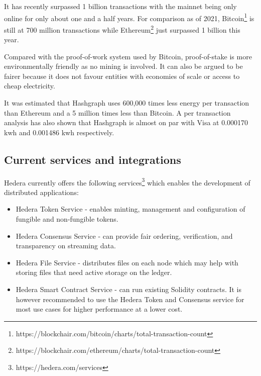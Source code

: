 It has recently surpassed 1 billion transactions with the mainnet being only online for only about one and a half years\cite{kunz2021hedera}. For comparison as of 2021, Bitcoin\footnote{https://blockchair.com/bitcoin/charts/total-transaction-count} is still at 700 million transactions while Ethereum\footnote{https://blockchair.com/ethereum/charts/total-transaction-count} just surpassed 1 billion this year.

Compared with the proof-of-work system used by Bitcoin, proof-of-stake is more environmentally friendly as no mining is involved. It can also be argued to be fairer because it does not favour entities with economies of scale or access to cheap electricity.

It was estimated that Hashgraph uses 600,000 times less energy per transaction than Ethereum and a 5 million times less than Bitcoin\cite{jiro2021power}. A per transaction analysis has also shown that Hashgraph is almost on par with Visa at 0.000170 kwh and 0.001486 kwh respectively.




\subsection{Current services and integrations}

Hedera currently offers the following services\footnote{https://hedera.com/services} which enables the development of distributed applications:

\begin{itemize}
    \item Hedera Token Service - enables minting, management and configuration of fungible and non-fungible tokens.
    \item Hedera Consensus Service - can provide fair ordering, verification, and transparency on streaming data.
    \item Hedera File Service - distributes files on each node which may help with storing files that need active storage on the ledger. 
    \item Hedera Smart Contract Service - can run existing Solidity contracts. It is however recommended to use the Hedera Token and Consensus service for most use cases for higher performance at a lower cost.
\end{itemize}



